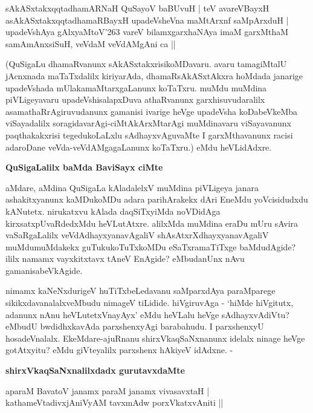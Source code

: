 \begin{shloka}
sAkASxtakxqqtadhamARNaH QuSayoV baBUvuH | teV avareVBayxH\\\label{106}
asAkASxtakxqqtadhamaRBayxH upadeVsheVna maMtArxnf saMpArxduH |\\
upadeVshAya gAlxyaMtoV\char'263 vareV bilamxgarxhaNAya imaM garxMthaM\\
samAmAnxsiSuH, veVdaM veVdAMgAni ca ||
\end{shloka}

\noindent
(QuSigaLu dhamaRvanunx sAkASxtakxrisikoMDavaru. avaru tamagiMtalU \hbox{jAcnxnada} maTaTxdalilx kiriyarAda, dhamaRsAkASxtAkxra hoMdada janarige upadeVshada mUlaka\break maMtarxgaLanunx koTaTxru. muMdu muMdina\- piVLige\-yavaru upadeVshisalapxDuva athaRvanunx garxhisuvudaralilx asamathaRrAgiruvudanunx gamanisi iva\-rige heVge upadeVsha koDabeVkeMba viSayadalilx soragidavarAgi-ciMtA\-kArxMtarAgi muMdinavaru viSa\-yavanunx paqthakakxrisi tegedukoLaLxlu sAdhayxvAguvaMte I garxMthavanunx racisi adaroDane veVda-veVdAMgagaLanunx koTaTxru.) eMdu heVLidAdxre.

{\bigskip
\noindent
{\large\bf QuSigaLalilx baMda BaviSayx ciMte}}\label{page106}
\medskip

\noindent
aMdare, aMdina QuSigaLa kAladalelxV muMdina piVLigeya janara ashakitxyanunx kaMDukoMDu adara pari\-hArakekx dAri EneMdu yoVcisidudxdu kANutetx. nirukatxvu kAlada daqSiTxyiMda noVDidAga kirxsatxpUvaR\-dedxMdu heVLutAtxre. alilxMda muMdina eraDu mUru sAvira vaSaRgaLalilx veVdAdhayxyanavAgaliV shAsAtxrX\-dhayxyanavAgaliV muMdumuMdakekx guTukukoTuTxkoMDu eSaTxramaTiTxge baMdudAgide? ililx namamx vayxkitxtavx tAneV EnAgide? eMbudanUnx nAvu gamanisabeVkAgide.

nimamx kaNeNxdurigeV huTiTxbeLedavanu saMparxdAya paraMparege sikikxdavanalalx\-veMbudu nimageV tiLidide. hiVgi\-ruvAga - `hiMde hiVgitutx, adanunx nAnu heVLutetxVnayAyx' eMdu heVLalu heVge sAdhayxvAdiVtu? eMbu\-dU bwdidhxkavAda parxshenxyAgi barabahudu. I parxshenxyU hosadeVnalalx. EkeMdare-ajuRnanu shirxVkaqSaNx\-nanunx idelalx ninage heVge gotAtxyitu? eMdu giVteyalilx parxshenx hAkiyeV idAdxne. -

{\bigskip
\noindent
{\large\bf shirxVkaqSaNxnalilxdadx gurutavxdaMte}}\label{page107}
\medskip

\begin{shloka}
aparaM BavatoV janamx paraM janamx vivasavxtaH |\\\label{107}
kathameVtadivxjAniVyAM tavxmAdw porxVkatxvAniti ||
\end{shloka}

